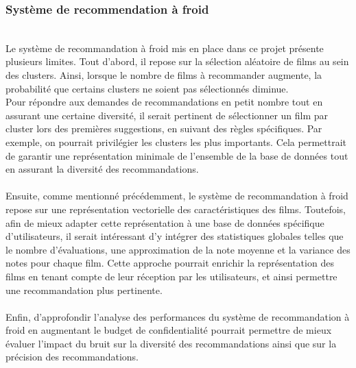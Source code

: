 \documentclass{article}
\begin{document}
\subsubsection{Système de recommendation à froid}
    $ $\\
    Le système de recommandation à froid mis en place dans ce projet présente plusieurs limites. 
    Tout d’abord, il repose sur la sélection aléatoire de films au sein des clusters. Ainsi, lorsque 
    le nombre de films à recommander augmente, la probabilité que certains clusters ne soient pas sélectionnés diminue.\\
    Pour répondre aux demandes de recommandations en petit nombre tout en assurant une certaine diversité, il serait pertinent 
    de sélectionner un film par cluster lors des premières suggestions, en suivant des règles spécifiques. Par exemple, on 
    pourrait privilégier les clusters les plus importants. Cela permettrait de garantir une représentation minimale de l’ensemble 
    de la base de données tout en assurant la diversité des recommandations.\\
    \\
    Ensuite, comme mentionné précédemment, le système de recommandation à froid repose sur une représentation 
    vectorielle des caractéristiques des films. Toutefois, afin de mieux adapter cette représentation 
    à une base de données spécifique d’utilisateurs, il serait intéressant d’y intégrer des 
    statistiques globales telles que le nombre d’évaluations, une approximation de la note moyenne 
    et la variance des notes pour chaque film. Cette approche pourrait enrichir la représentation 
    des films en tenant compte de leur réception par les utilisateurs, et ainsi permettre une recommandation plus pertinente.\\
    \\
    Enfin, d'approfondir l'analyse des performances du système de recommandation à froid en augmentant le budget de confidentialité
    pourrait permettre de mieux évaluer l'impact du bruit sur la diversité des recommandations ainsi que sur la précision des recommandations.
\end{document}
